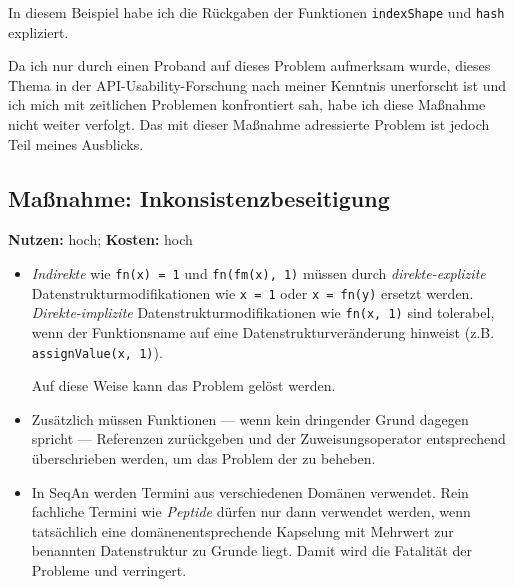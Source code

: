 In diesem Beispiel habe ich die Rückgaben der Funktionen \texttt{indexShape} und \texttt{hash} expliziert.

Da ich nur durch einen Proband auf dieses Problem aufmerksam wurde, dieses Thema in der API-Usability-Forschung nach meiner Kenntnis unerforscht ist und ich mich mit zeitlichen Problemen konfrontiert sah, habe ich diese Maßnahme nicht weiter verfolgt. Das mit dieser Maßnahme adressierte Problem  ist jedoch Teil meines Ausblicks.




\subsection{Maßnahme: Inkonsistenzbeseitigung}
\textbf{Nutzen:} hoch; \textbf{Kosten:} hoch

\begin{itemize}
  \item \textit{Indirekte}  wie \texttt{fn(x) = 1} und \texttt{fn(fm(x), 1)} müssen durch \textit{direkte-explizite} Datenstrukturmodifikationen wie \texttt{x = 1} oder \texttt{x = fn(y)} ersetzt werden. \textit{Direkte-implizite} Datenstrukturmodifikationen wie \texttt{fn(x, 1)} sind tolerabel, wenn der Funktionsname auf eine Datenstrukturveränderung hinweist (z.B. \texttt{assignValue(x, 1)}).
  
  Auf diese Weise kann das Problem  gelöst werden.
  
  \item Zusätzlich müssen Funktionen --- wenn kein dringender Grund dagegen spricht --- Referenzen zurückgeben und der Zuweisungsoperator entsprechend überschrieben werden, um das Problem der  zu beheben.
  

  \item In SeqAn werden Termini aus verschiedenen Domänen verwendet. Rein fachliche Termini wie \textit{Peptide} dürfen nur dann verwendet werden, wenn tatsächlich eine domänenentsprechende Kapselung mit Mehrwert zur benannten Datenstruktur zu Grunde liegt. Damit wird die Fatalität der Probleme  und  verringert.
\end{itemize}









